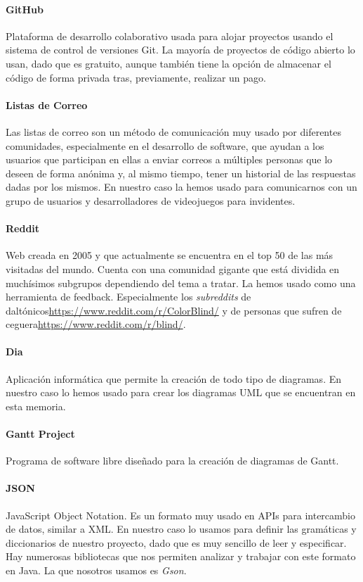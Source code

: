  \paragraph{GitHub} Plataforma de desarrollo colaborativo usada para alojar proyectos usando el sistema de control de versiones Git. La mayoría de proyectos de código abierto lo usan, dado que es gratuito, aunque también tiene la opción de almacenar el código de forma privada tras, previamente, realizar un pago.

 \paragraph{Listas de Correo} Las listas de correo son un método de comunicación muy usado por diferentes comunidades, especialmente en el desarrollo de software, que ayudan a los usuarios que participan en ellas a enviar correos a múltiples personas que lo deseen de forma anónima y, al mismo tiempo, tener un historial de las respuestas dadas por los mismos. En nuestro caso la hemos usado para comunicarnos con un grupo de usuarios y desarrolladores de videojuegos para invidentes.

 \paragraph{Reddit} Web creada en 2005 y que actualmente se encuentra en el top 50 de las más visitadas del mundo. Cuenta con una comunidad gigante que está dividida en muchísimos subgrupos dependiendo del tema a tratar. La hemos usado como una herramienta de feedback. Especialmente los \textit{subreddits} de daltónicos\url{https://www.reddit.com/r/ColorBlind/} y de personas que sufren de ceguera\url{https://www.reddit.com/r/blind/}. 

\paragraph{Dia} Aplicación informática que permite la creación de todo tipo de diagramas. En nuestro caso lo hemos usado para crear los diagramas UML que se encuentran en esta memoria.

\paragraph{Gantt Project} Programa de software libre diseñado para la creación de diagramas de Gantt.

\paragraph{JSON} JavaScript Object Notation. Es un formato muy usado en APIs para intercambio de datos, similar a XML. En nuestro caso lo usamos para definir las gramáticas y diccionarios de nuestro proyecto, dado que es muy sencillo de leer y especificar. Hay numerosas bibliotecas que nos permiten analizar y trabajar con este formato en Java. La que nosotros usamos es \textit{Gson}.

